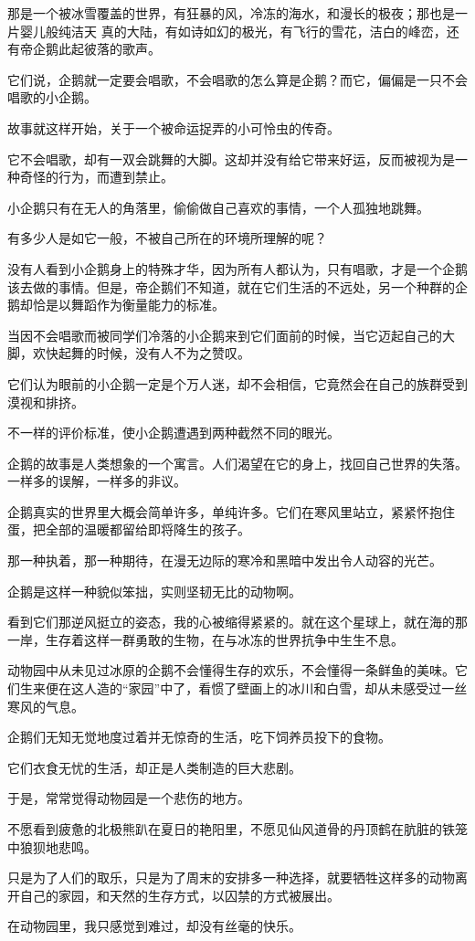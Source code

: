 	\endwriting



		那是一个被冰雪覆盖的世界，有狂暴的风，冷冻的海水，和漫长的极夜；那也是一片婴儿般纯洁天
	真的大陆，有如诗如幻的极光，有飞行的雪花，洁白的峰峦，还有帝企鹅此起彼落的歌声。

		\vspace{1em}
		它们说，企鹅就一定要会唱歌，不会唱歌的怎么算是企鹅？而它，偏偏是一只不会唱歌的小企鹅。\par
		故事就这样开始，关于一个被命运捉弄的小可怜虫的传奇。

		\vspace{1em}
		它不会唱歌，却有一双会跳舞的大脚。这却并没有给它带来好运，反而被视为是一种奇怪的行为，而遭到禁止。\par
		小企鹅只有在无人的角落里，偷偷做自己喜欢的事情，一个人孤独地跳舞。\par
		有多少人是如它一般，不被自己所在的环境所理解的呢？\par
		没有人看到小企鹅身上的特殊才华，因为所有人都认为，只有唱歌，才是一个企鹅该去做的事情。但是，帝企鹅们不知道，就在它们生活的不远处，另一个种群的企鹅却恰是以舞蹈作为衡量能力的标准。\par
		当因不会唱歌而被同学们冷落的小企鹅来到它们面前的时候，当它迈起自己的大脚，欢快起舞的时候，没有人不为之赞叹。\par
		它们认为眼前的小企鹅一定是个万人迷，却不会相信，它竟然会在自己的族群受到漠视和排挤。\par
		不一样的评价标准，使小企鹅遭遇到两种截然不同的眼光。

		\vspace{1em}
		企鹅的故事是人类想象的一个寓言。人们渴望在它的身上，找回自己世界的失落。一样多的误解，一样多的非议。

		企鹅真实的世界里大概会简单许多，单纯许多。它们在寒风里站立，紧紧怀抱住蛋，把全部的温暖都留给即将降生的孩子。\par
		那一种执着，那一种期待，在漫无边际的寒冷和黑暗中发出令人动容的光芒。\par
		企鹅是这样一种貌似笨拙，实则坚韧无比的动物啊。\par
		看到它们那逆风挺立的姿态，我的心被缩得紧紧的。就在这个星球上，就在海的那一岸，生存着这样一群勇敢的生物，在与冰冻的世界抗争中生生不息。

		\vspace{1em}
		动物园中从未见过冰原的企鹅不会懂得生存的欢乐，不会懂得一条鲜鱼的美味。它们生来便在这人造的“家园”中了，看惯了壁画上的冰川和白雪，却从未感受过一丝寒风的气息。\par
		企鹅们无知无觉地度过着并无惊奇的生活，吃下饲养员投下的食物。\par
		它们衣食无忧的生活，却正是人类制造的巨大悲剧。\par
		于是，常常觉得动物园是一个悲伤的地方。\par
		不愿看到疲惫的北极熊趴在夏日的艳阳里，不愿见仙风道骨的丹顶鹤在肮脏的铁笼中狼狈地悲鸣。\par
		只是为了人们的取乐，只是为了周末的安排多一种选择，就要牺牲这样多的动物离开自己的家园，和天然的生存方式，以囚禁的方式被展出。\par
		在动物园里，我只感觉到难过，却没有丝毫的快乐。

